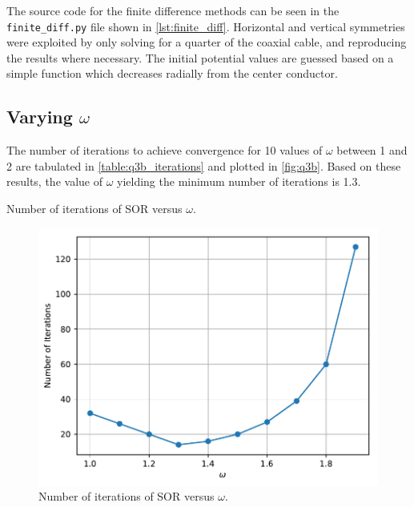 \documentclass[a4paper,titlepage]{article}
\begin{document}
	The source code for the finite difference methods can be seen in the \texttt{finite_diff.py} file shown in \autoref{lst:finite_diff}. Horizontal and vertical symmetries were exploited by only solving for a quarter of the coaxial cable, and reproducing the results where necessary. The initial potential values are guessed based on a simple function which decreases radially from the center conductor.
	
	\subsection{Varying $\omega$}
	
	The number of iterations to achieve convergence for 10 values of $\omega$ between 1 and 2 are tabulated in \autoref{table:q3b_iterations} and plotted in \autoref{fig:q3b}. Based on these results, the value of $\omega$ yielding the minimum number of iterations is 1.3.
	
	\begin{table}[!htb]
		\centering
		\caption{Number of iterations of SOR versus $\omega$.}
		\label{table:q3b_iterations}
	\end{table}
	
	\begin{figure}[!htb]
		\centering
		\includegraphics[width=\columnwidth]{plots/q3b.pdf}
		\caption
		{Number of iterations of SOR versus $\omega$.}
		\label{fig:q3b}
	\end{figure}
\end{document}
